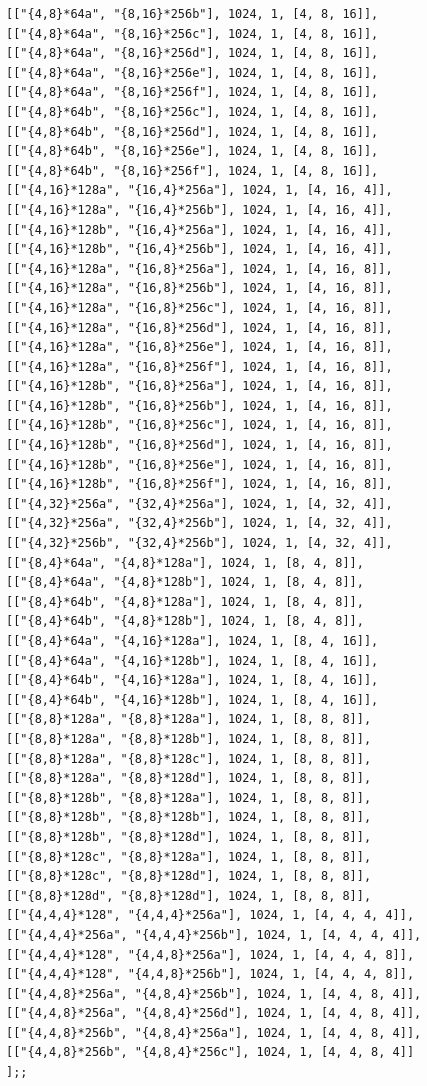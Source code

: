 \documentclass[
  11pt,
  a4paper,
]{article}
\begin{document}
\begin{verbatim}
[["{4,8}*64a", "{8,16}*256b"], 1024, 1, [4, 8, 16]],
[["{4,8}*64a", "{8,16}*256c"], 1024, 1, [4, 8, 16]],
[["{4,8}*64a", "{8,16}*256d"], 1024, 1, [4, 8, 16]],
[["{4,8}*64a", "{8,16}*256e"], 1024, 1, [4, 8, 16]],
[["{4,8}*64a", "{8,16}*256f"], 1024, 1, [4, 8, 16]],
[["{4,8}*64b", "{8,16}*256c"], 1024, 1, [4, 8, 16]],
[["{4,8}*64b", "{8,16}*256d"], 1024, 1, [4, 8, 16]],
[["{4,8}*64b", "{8,16}*256e"], 1024, 1, [4, 8, 16]],
[["{4,8}*64b", "{8,16}*256f"], 1024, 1, [4, 8, 16]],
[["{4,16}*128a", "{16,4}*256a"], 1024, 1, [4, 16, 4]],
[["{4,16}*128a", "{16,4}*256b"], 1024, 1, [4, 16, 4]],
[["{4,16}*128b", "{16,4}*256a"], 1024, 1, [4, 16, 4]],
[["{4,16}*128b", "{16,4}*256b"], 1024, 1, [4, 16, 4]],
[["{4,16}*128a", "{16,8}*256a"], 1024, 1, [4, 16, 8]],
[["{4,16}*128a", "{16,8}*256b"], 1024, 1, [4, 16, 8]],
[["{4,16}*128a", "{16,8}*256c"], 1024, 1, [4, 16, 8]],
[["{4,16}*128a", "{16,8}*256d"], 1024, 1, [4, 16, 8]],
[["{4,16}*128a", "{16,8}*256e"], 1024, 1, [4, 16, 8]],
[["{4,16}*128a", "{16,8}*256f"], 1024, 1, [4, 16, 8]],
[["{4,16}*128b", "{16,8}*256a"], 1024, 1, [4, 16, 8]],
[["{4,16}*128b", "{16,8}*256b"], 1024, 1, [4, 16, 8]],
[["{4,16}*128b", "{16,8}*256c"], 1024, 1, [4, 16, 8]],
[["{4,16}*128b", "{16,8}*256d"], 1024, 1, [4, 16, 8]],
[["{4,16}*128b", "{16,8}*256e"], 1024, 1, [4, 16, 8]],
[["{4,16}*128b", "{16,8}*256f"], 1024, 1, [4, 16, 8]],
[["{4,32}*256a", "{32,4}*256a"], 1024, 1, [4, 32, 4]],
[["{4,32}*256a", "{32,4}*256b"], 1024, 1, [4, 32, 4]],
[["{4,32}*256b", "{32,4}*256b"], 1024, 1, [4, 32, 4]],
[["{8,4}*64a", "{4,8}*128a"], 1024, 1, [8, 4, 8]],
[["{8,4}*64a", "{4,8}*128b"], 1024, 1, [8, 4, 8]],
[["{8,4}*64b", "{4,8}*128a"], 1024, 1, [8, 4, 8]],
[["{8,4}*64b", "{4,8}*128b"], 1024, 1, [8, 4, 8]],
[["{8,4}*64a", "{4,16}*128a"], 1024, 1, [8, 4, 16]],
[["{8,4}*64a", "{4,16}*128b"], 1024, 1, [8, 4, 16]],
[["{8,4}*64b", "{4,16}*128a"], 1024, 1, [8, 4, 16]],
[["{8,4}*64b", "{4,16}*128b"], 1024, 1, [8, 4, 16]],
[["{8,8}*128a", "{8,8}*128a"], 1024, 1, [8, 8, 8]],
[["{8,8}*128a", "{8,8}*128b"], 1024, 1, [8, 8, 8]],
[["{8,8}*128a", "{8,8}*128c"], 1024, 1, [8, 8, 8]],
[["{8,8}*128a", "{8,8}*128d"], 1024, 1, [8, 8, 8]],
[["{8,8}*128b", "{8,8}*128a"], 1024, 1, [8, 8, 8]],
[["{8,8}*128b", "{8,8}*128b"], 1024, 1, [8, 8, 8]],
[["{8,8}*128b", "{8,8}*128d"], 1024, 1, [8, 8, 8]],
[["{8,8}*128c", "{8,8}*128a"], 1024, 1, [8, 8, 8]],
[["{8,8}*128c", "{8,8}*128d"], 1024, 1, [8, 8, 8]],
[["{8,8}*128d", "{8,8}*128d"], 1024, 1, [8, 8, 8]],
[["{4,4,4}*128", "{4,4,4}*256a"], 1024, 1, [4, 4, 4, 4]],
[["{4,4,4}*256a", "{4,4,4}*256b"], 1024, 1, [4, 4, 4, 4]],
[["{4,4,4}*128", "{4,4,8}*256a"], 1024, 1, [4, 4, 4, 8]],
[["{4,4,4}*128", "{4,4,8}*256b"], 1024, 1, [4, 4, 4, 8]],
[["{4,4,8}*256a", "{4,8,4}*256b"], 1024, 1, [4, 4, 8, 4]],
[["{4,4,8}*256a", "{4,8,4}*256d"], 1024, 1, [4, 4, 8, 4]],
[["{4,4,8}*256b", "{4,8,4}*256a"], 1024, 1, [4, 4, 8, 4]],
[["{4,4,8}*256b", "{4,8,4}*256c"], 1024, 1, [4, 4, 8, 4]]
];;
\end{verbatim}
\end{document}
